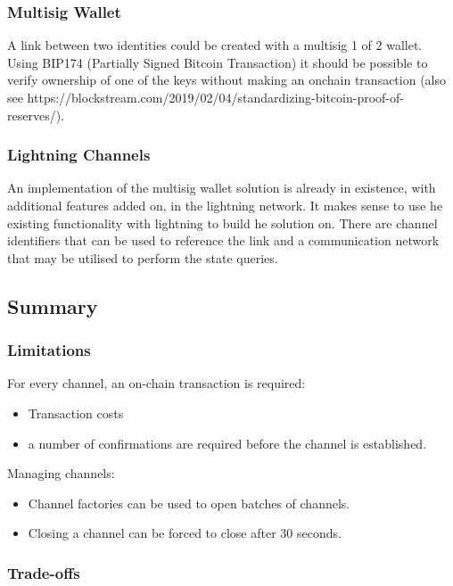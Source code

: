 \documentclass[10pt,a4paper]{runcrypto}
\begin{document}
\subsubsection{Multisig Wallet}

A link between two identities could be created with a multisig 1 of 2 wallet. Using BIP174 (Partially Signed Bitcoin Transaction) it should be possible to verify ownership of one of the keys without making an onchain transaction (also see https://blockstream.com/2019/02/04/standardizing-bitcoin-proof-of-reserves/).

\subsubsection{Lightning Channels}

An implementation of the multisig wallet solution is already in existence, with additional features added on, in the lightning network. It makes sense to use he existing functionality with lightning to build he solution on. There are channel identifiers that can be used to reference the link and a communication network that may be utilised to perform the state queries.

\subsection{Summary}

\subsubsection{Limitations}
For every channel, an on-chain transaction is required:
\begin{itemize}
	\item Transaction costs
	\item a number of confirmations are required before the channel is established.
\end{itemize}

Managing channels:
\begin{itemize}
	\item Channel factories can be used to open batches of channels.
	\item Closing a channel can be forced to close after 30 seconds.
\end{itemize}

\subsubsection{Trade-offs}
\end{document}
